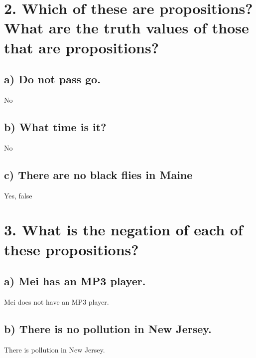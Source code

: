 \documentclass[11pt, oneside]{article} %
\numberwithin{equation}{section} %
\numberwithin{figure}{section} %
\begin{document}




\section{2. Which of these are propositions? What are the truth values of those that are propositions?}


\subsection{a) Do not pass go.}
No
\subsection{b) What time is it?}
No
\subsection{c) There are no black flies in Maine}
Yes, false

\section{3. What is the negation of each of these propositions?}
\subsection{a) Mei has an MP3 player.}
Mei does not have an MP3 player.
\subsection{b) There is no pollution in New Jersey.}
There is pollution in New Jersey.
\end{document}
